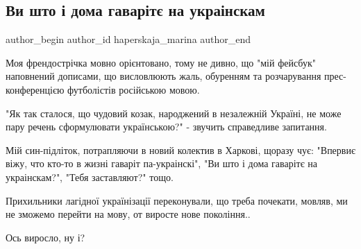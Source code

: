  
 
 
 
 
 
\subsection{Ви што і дома гаварітє на украінскам}
\label{sec:30_06_2021.fb.haperskaja_marina.1.mova_futbol}
 
\ifcmt
 author_begin
   author_id haperskaja_marina
 author_end
\fi

Моя френдострічка мовно орієнтовано, тому не дивно, що "мій фейсбук" наповнений
дописами, що висловлюють жаль,  обуренням та розчарування  прес-конференцією
футболістів російською мовою.

"Як так сталося, що чудовий козак,  народжений в незалежній Україні,  не може
пару речень сформулювати українською?" - звучить справедливе запитання.

Мій син-підліток, потрапляючи в новий колектив в Харкові, щоразу чує: "Впервиє
віжу, что кто-то в жизні гаваріт па-украінскі", "Ви што і дома гаварітє на
украінскам?", "Тебя заставляют?" тощо.

Прихильники лагідної українізації переконували,  що треба почекати, мовляв,  ми
не зможемо перейти на мову,  от виросте нове покоління..

Ось виросло, ну і?

